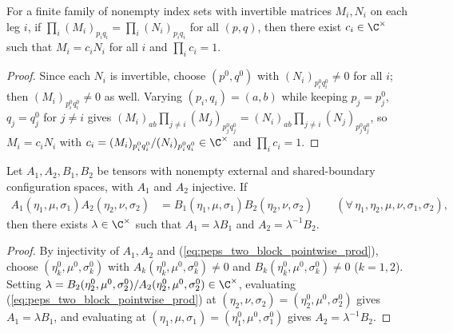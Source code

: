 \begin{lemma}%
    \label{thm:peps_piProductFormsScalar}
    \leanok
    For a finite family of nonempty index sets with invertible matrices
    $M_i,N_i$ on each leg $i$, if
    $\prod_i(M_i)_{p_iq_i}=\prod_i(N_i)_{p_iq_i}$ for all $(p,q)$, then there
    exist $c_i\in\C^\times$ such that $M_i=c_iN_i$ for all $i$ and
    $\prod_i c_i=1$.
\end{lemma}
\begin{proof}\leanok
    Since each $N_i$ is invertible, choose $(p^0,q^0)$ with
    $(N_i)_{p^0_iq^0_i}\neq 0$ for all $i$; then $(M_i)_{p^0_iq^0_i}\neq 0$ as
    well. Varying $(p_i,q_i)=(a,b)$ while keeping $p_j=p^0_j$, $q_j=q^0_j$ for
    $j\neq i$ gives
    $(M_i)_{ab}\prod_{j\neq i}(M_j)_{p^0_jq^0_j}=(N_i)_{ab}\prod_{j\neq i}(N_j)_{p^0_jq^0_j}$,
    so $M_i=c_i N_i$ with $c_i=(M_i)_{p^0_iq^0_i}/(N_i)_{p^0_iq^0_i}\in\C^\times$
    and $\prod_i c_i=1$.
\end{proof}

\begin{lemma}%
    \label{thm:peps_twoBlockPointwiseProductCancellation}
    \leanok
    Let $A_1,A_2,B_1,B_2$ be tensors with nonempty external and shared-boundary
    configuration spaces, with $A_1$ and $A_2$ injective. If
    \begin{align}
        A_1(\eta_1,\mu,\sigma_1)A_2(\eta_2,\nu,\sigma_2)
         & =
        B_1(\eta_1,\mu,\sigma_1)B_2(\eta_2,\nu,\sigma_2)
        \qquad (\forall\,\eta_1,\eta_2,\mu,\nu,\sigma_1,\sigma_2),
        \label{eq:peps_two_block_pointwise_prod}
    \end{align}
    then there exists $\lambda\in\C^\times$ such that
    $A_1=\lambda B_1$ and $A_2=\lambda^{-1}B_2$.
\end{lemma}
\begin{proof}\leanok
    By injectivity of $A_1,A_2$ and (\ref{eq:peps_two_block_pointwise_prod}),
    choose $(\eta_k^0,\mu^0,\sigma_k^0)$ with
    $A_k(\eta_k^0,\mu^0,\sigma_k^0)\neq 0$ and
    $B_k(\eta_k^0,\mu^0,\sigma_k^0)\neq 0$ ($k=1,2$). Setting
    $\lambda=B_2(\eta_2^0,\mu^0,\sigma_2^0)/A_2(\eta_2^0,\mu^0,\sigma_2^0)\in\C^\times$,
    evaluating (\ref{eq:peps_two_block_pointwise_prod}) at
    $(\eta_2,\nu,\sigma_2)=(\eta_2^0,\mu^0,\sigma_2^0)$ gives $A_1=\lambda B_1$,
    and evaluating at $(\eta_1,\mu,\sigma_1)=(\eta_1^0,\mu^0,\sigma_1^0)$ gives
    $A_2=\lambda^{-1}B_2$.
\end{proof}

